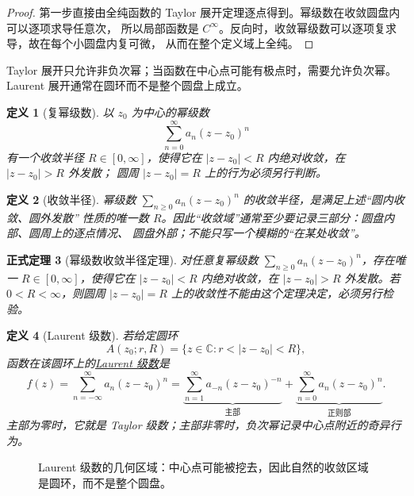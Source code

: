 \documentclass[UTF8,fontset=none,a4paper,11pt]{ctexart}
\theoremstyle{foundation-definition}
\newtheorem{definition}{定义}[section]
\theoremstyle{foundation-theorem}
\newtheorem{theorem}[definition]{正式定理}
\theoremstyle{foundation-proposition}
\theoremstyle{foundation-example}
\theoremstyle{foundation-remark}
\theoremstyle{foundation-theorem}
\newcommand{\term}[2]{\hyperref[#1]{#2}}
\begin{document}
\begin{proof}
第一步直接由全纯函数的 Taylor 展开定理逐点得到。幂级数在收敛圆盘内可以逐项求导任意次，
所以局部函数是 \(C^\infty\)。反向时，收敛幂级数可以逐项复求导，故在每个小圆盘内复可微，
从而在整个定义域上全纯。
\end{proof}

Taylor 展开只允许非负次幂；当函数在中心点可能有极点时，需要允许负次幂。Laurent 展开通常在圆环而不是整个圆盘上成立。

\begin{definition}[复幂级数]\label{def:power-series}
以 \(z_0\) 为中心的幂级数
\[
\sum_{n=0}^{\infty}a_n(z-z_0)^n
\]
有一个收敛半径 \(R\in[0,\infty]\)，使得它在
\(|z-z_0|<R\) 内绝对收敛，在 \(|z-z_0|>R\) 外发散；
圆周 \(|z-z_0|=R\) 上的行为必须另行判断。
\end{definition}

\begin{definition}[收敛半径]\label{def:convergence-radius}
幂级数 \(\sum_{n\ge0}a_n(z-z_0)^n\) 的收敛半径，是满足上述“圆内收敛、圆外发散”
性质的唯一数 \(R\)。因此“收敛域”通常至少要记录三部分：圆盘内部、圆周上的逐点情况、
圆盘外部；不能只写一个模糊的“在某处收敛”。
\end{definition}

\begin{theorem}[幂级数收敛半径定理]\label{thm:power-series-radius}
对任意复幂级数 \(\sum_{n\ge0}a_n(z-z_0)^n\)，存在唯一
\(R\in[0,\infty]\)，使得它在 \(|z-z_0|<R\) 内绝对收敛，在
\(|z-z_0|>R\) 外发散。若 \(0<R<\infty\)，则圆周
\(|z-z_0|=R\) 上的收敛性不能由这个定理决定，必须另行检验。
\end{theorem}

\begin{definition}[Laurent 级数]\label{def:laurent-series}
若给定圆环
\[
A(z_0;r,R)=\{z\in\mathbb C:r<|z-z_0|<R\},
\]
函数在该圆环上的\term{def:laurent-series}{Laurent 级数}是
\[
f(z)=\sum_{n=-\infty}^{\infty}a_n(z-z_0)^n
=\underbrace{\sum_{n=1}^{\infty}a_{-n}(z-z_0)^{-n}}_{\text{主部}}
+\underbrace{\sum_{n=0}^{\infty}a_n(z-z_0)^n}_{\text{正则部}}.
\]
主部为零时，它就是 Taylor 级数；主部非零时，负次幂记录中心点附近的奇异行为。
\end{definition}

\begin{figure}[htbp]
\centering
{}
\caption{Laurent 级数的几何区域：中心点可能被挖去，因此自然的收敛区域是圆环，而不是整个圆盘。}
\label{fig:laurent-annulus}
\end{figure}
\end{document}
